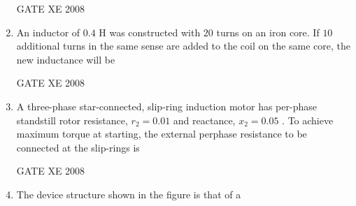 \documentclass[12pt]{article}
\begin{document}
\begin{enumerate}[label=Q\arabic*.]
GATE XE 2008
\item An inductor of $0.4$ H was constructed with $20$ turns on an iron core. If $10$ additional turns in the same sense are added to the coil on the same core, the new inductance will be

\begin{enumerate}[label=(\Alph*)]
\end{enumerate}

GATE XE 2008
\item  A three-phase star-connected, slip-ring induction motor has per-phase standstill rotor resistance, $r_{2} = 0.01$ and reactance, $x_{2} = 0.05$ . To achieve maximum torque at starting, the external perphase resistance to be connected at the slip-rings is

\begin{enumerate}[label=(\Alph*)]
\end{enumerate}

GATE XE 2008
\item  The device structure shown in the figure is that of a


\end{enumerate}
\end{document}
